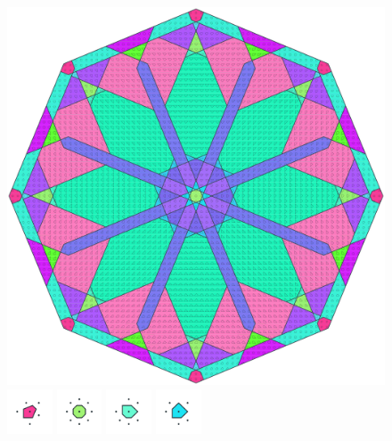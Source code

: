 \documentclass[text.tex]{subfiles}
\begin{document}
\clearpage
\pagestyle{fancy}
\fancyhf{}
\begin{figure}[h!]
\centering
\includegraphics[width=1\textwidth]{img/results/octagon/octagon_103553_(-10_5alpha_2).pdf}
\includegraphics[width=0.12\textwidth]{img/results/octagon/octagon_103553_(-10_5alpha_2)_001.pdf}
\includegraphics[width=0.12\textwidth]{img/results/octagon/octagon_103553_(-10_5alpha_2)_002.pdf}
\includegraphics[width=0.12\textwidth]{img/results/octagon/octagon_103553_(-10_5alpha_2)_003.pdf}
\includegraphics[width=0.12\textwidth]{img/results/octagon/octagon_103553_(-10_5alpha_2)_004.pdf}

\end{figure}
\end{document}
